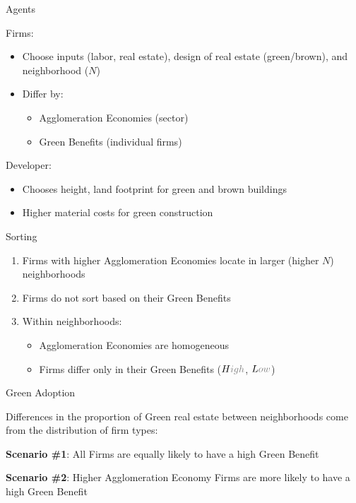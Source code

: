 \documentclass[11pt, dvipsnames, usenames]{beamer}
\begin{document}
\begin{frame}{Agents}

Firms:
\begin{itemize}
	\item Choose inputs (labor, real estate), design of real estate (green/brown), and neighborhood ($N$)
	\item Differ by:
	\begin{itemize}
		\item Agglomeration Economies (sector)
		\item Green Benefits (individual firms)
	\end{itemize}
\end{itemize}

\vfill
Developer:
\begin{itemize}
	\item Chooses height, land footprint for green and brown buildings
	\item Higher material costs for green construction
\end{itemize}

\end{frame}


\begin{frame}{Sorting}

\begin{enumerate}
	\item Firms with higher Agglomeration Economies locate in larger (higher $N$) neighborhoods
	
	\vfill
	\item Firms do not sort based on their Green Benefits
	
	\vfill
	\item Within neighborhoods:
	\begin{itemize}
		\item Agglomeration Economies are homogeneous
		\item Firms differ only in their Green Benefits ($H\textcolor{gray}{igh}$, $L\textcolor{gray}{ow}$)
	\end{itemize}
\end{enumerate}

\end{frame}

\begin{frame}{Green Adoption}

Differences in the proportion of Green real estate between neighborhoods come from the distribution of firm types:

\vfill
\textbf{Scenario \#1}: All Firms are equally likely to have a high Green Benefit

\vfill
\textbf{Scenario \#2}: Higher Agglomeration Economy Firms are more likely to have a high Green Benefit
\end{frame}
\end{document}
